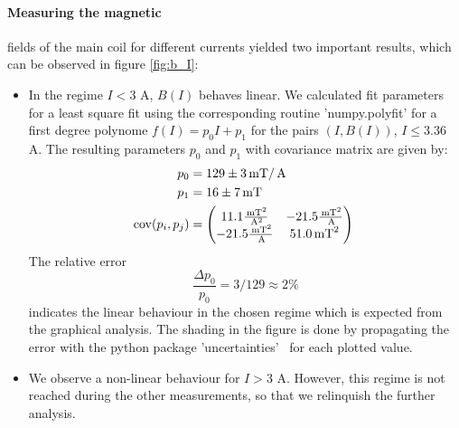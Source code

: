 \paragraph{Measuring the magnetic}
fields of the main coil for different currents yielded two 
important results, which can be observed in figure \ref{fig:b_I}:
\begin{itemize}
    \item
        In the regime $I < 3$ A, $B(I)$ behaves linear. We calculated fit parameters 
        for a least square fit using the corresponding routine 'numpy.polyfit'\cite{scipy} for 
        a first degree polynome $f(I) = p_0 I + p_1$ for the pairs $(I, B(I))$, $I \le 3.36$ A. 
        The resulting parameters $p_0$ and $p_1$ with covariance matrix are given by:
        \begin{align}
            p_0 &= 129 \pm 3 \, \mathrm{mT} / \, \mathrm{A}\\
            p_1 &= 16 \pm 7 \, \mathrm{mT}\\
            \mathrm{cov}(p_i, p_j) &= 
            \begin{pmatrix}
                11.1\frac{\, \mathrm{mT}^2}{\, \mathrm{A}^2} &-21.5\frac{\, \mathrm{mT}^2}{\, \mathrm{A}} \\
                -21.5\frac{\, \mathrm{mT}^2}{\, \mathrm{A}} &51.0\, \mathrm{mT}^2 \\
            \end{pmatrix} 
            \, \mathrm{}
        \end{align}
        The relative error 
        \begin{equation}
            \frac{\Delta p_0}{p_0} = 3 / 129 \approx 2\%
        \end{equation}
        indicates the linear behaviour in the chosen regime which is expected from the 
        graphical analysis. The shading in the figure is done by propagating the error with 
        the python package 'uncertainties'~\cite{uc} for each plotted value.
    \item
        We observe a non-linear behaviour for $I > 3$ A. However, this regime is 
        not reached during the other measurements, so that we relinquish the further analysis. 
\end{itemize}
